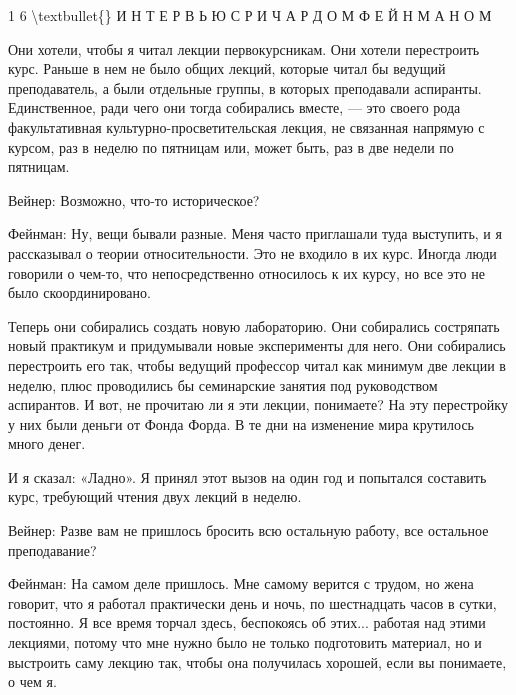\documentclass[10pt,oneside]{article}
\begin{document}
1 6 \textbackslash{}textbullet\{\} И Н Т Е Р В Ь Ю  С  Р И Ч А Р Д О М  Ф Е Й Н М А Н О М\par

Они хотели, чтобы я читал лекции первокурсникам. Они хотели перестроить курс. Раньше в нем не было общих лекций, которые читал бы ведущий преподаватель, а были отдельные группы, в которых преподавали аспиранты. Единственное, ради чего они тогда собирались вместе, --- это своего рода факультативная культурно-просветительская лекция, не связанная напрямую с курсом, раз в неделю по пятницам или, может быть, раз в две недели по пятницам.\par

Вейнер: Возможно, что-то историческое?\par

Фейнман: Ну, вещи бывали разные. Меня часто приглашали туда выступить, и я рассказывал о теории относительности. Это не входило в их курс. Иногда люди говорили о чем-то, что непосредственно относилось к их курсу, но все это не было скоординировано.\par

Теперь они собирались создать новую лабораторию. Они собирались состряпать новый практикум и придумывали новые эксперименты для него. Они собирались перестроить его так, чтобы ведущий профессор читал как минимум две лекции в неделю, плюс проводились бы семинарские занятия под руководством аспирантов. И вот, не прочитаю ли я эти лекции, понимаете? На эту перестройку у них были деньги от Фонда Форда. В те дни на изменение мира крутилось много денег.\par

И я сказал: «Ладно». Я принял этот вызов на один год и попытался составить курс, требующий чтения двух лекций в неделю.\par

Вейнер: Разве вам не пришлось бросить всю остальную работу, все остальное преподавание?\par

Фейнман: На самом деле пришлось. Мне самому верится с трудом, но жена говорит, что я работал практически день и ночь, по шестнадцать часов в сутки, постоянно. Я все время торчал здесь, беспокоясь об этих... работая над этими лекциями, потому что мне нужно было не только подготовить материал, но и выстроить саму лекцию так, чтобы она получилась хорошей, если вы понимаете, о чем я.\par
\end{document}
